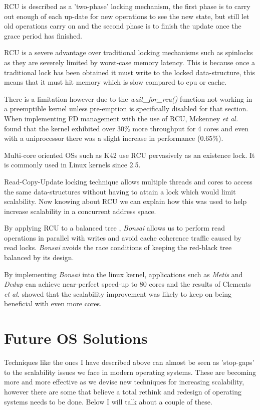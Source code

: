 \documentclass[journal]{IEEEtran}
\begin{document}
RCU is described as a 'two-phase' locking mechanism, the first phase is to carry out enough of each up-date for new operations to see the new state, but still let old operations carry on and the second phase is to finish the update once the grace period has finished.

RCU is a severe advantage over traditional locking mechanisms such as spinlocks as they are severely limited by worst-case memory latency. This is because once a traditional lock has been obtained it must write to the locked data-structure, this means that it must hit memory which is slow compared to cpu or cache.

There is a limitation however due to the \emph{wait\_for\_rcu()} function not working in a preemptible kernel unless pre-emption is specifically disabled for that section.
When implementing FD management with the use of RCU, Mckenney \emph{et al.} \cite{RCU} found that the kernel exhibited over 30\% more throughput for 4 cores and even with a uniprocessor there was a slight increase in performance (0.65\%).

Multi-core oriented OSs such as K42 \cite{K42} use RCU pervasively as an existence lock. It is commonly used in Linux kernels since 2.5.

Read-Copy-Update locking technique allows multiple threads and cores to access the same data-structures without having to attain a lock which would limit scalability. Now knowing about RCU we can explain how this was used to help increase scalability in a concurrent address space.

By applying RCU to a balanced tree \cite{Bonsai}, \emph{Bonsai} allows us to perform read operations in parallel with writes and avoid cache coherence traffic caused by read locks. \emph{Bonsai} avoids the race conditions of keeping the red-black tree balanced by its design.

By implementing \emph{Bonsai} into the linux kernel, applications such as \emph{Metis} and \emph{Dedup} can achieve near-perfect speed-up to 80 cores and the results of Clements \emph{et al.} showed that the scalability improvement was likely to keep on being beneficial with even more cores.

\section{Future OS Solutions}

Techniques like the ones I have described above can almost be seen as 'stop-gaps' to the scalability issues we face in modern operating systems. These are becoming more and more effective as we devise new techniques for increasing scalability, however there are some that believe a total rethink and redesign of operating systems needs to be done. Below I will talk about a couple of these.
\end{document}
